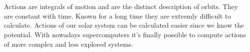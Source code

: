 \\\\
Actions are integrals of motion and are the distinct description of orbits. They are constant with time. Known for a long time they are extremly difficult to calculate. Actions of our solar system can be calculated easier since we know the potential. With nowadays supercomputers it's finally possible to compute actions of more complex and less explored systems.

